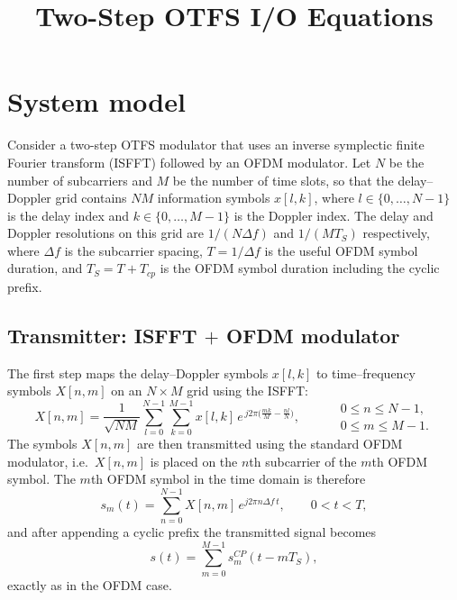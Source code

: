 \documentclass[11pt]{article}
\title{Two-Step OTFS I/O Equations}
\author{}
\date{}
\begin{document}
\maketitle

\section*{System model}

Consider a two-step OTFS modulator that uses an inverse symplectic finite
Fourier transform (ISFFT) followed by an OFDM modulator. Let \(N\) be the
number of subcarriers and \(M\) be the number of time slots, so that the
delay--Doppler grid contains \(NM\) information symbols
\(x[l,k]\), where \(l \in \{0,\dots,N-1\}\) is the delay index and
\(k \in \{0,\dots,M-1\}\) is the Doppler index. The delay and Doppler
resolutions on this grid are \(1/(N\Delta f)\) and \(1/(MT_S)\) respectively,
where \(\Delta f\) is the subcarrier spacing, \(T = 1/\Delta f\) is the useful
OFDM symbol duration, and \(T_S = T + T_{cp}\) is the OFDM symbol duration
including the cyclic prefix.

\subsection*{Transmitter: ISFFT \(+\) OFDM modulator}

The first step maps the delay--Doppler symbols \(x[l,k]\) to time--frequency
symbols \(X[n,m]\) on an \(N \times M\) grid using the ISFFT:
\begin{equation}
    X[n,m] = \frac{1}{\sqrt{NM}}
             \sum_{l=0}^{N-1}\sum_{k=0}^{M-1} x[l,k]\,
             e^{\,j2\pi\bigl(\tfrac{mk}{M} - \tfrac{nl}{N}\bigr)},
    \qquad
    \begin{aligned}
    &0 \leq n \leq N-1, \\
    &0 \leq m \leq M-1.
    \end{aligned}
\end{equation}
The symbols \(X[n,m]\) are then transmitted using the standard OFDM modulator,
i.e.\ \(X[n,m]\) is placed on the \(n\)th subcarrier of the \(m\)th OFDM
symbol. The \(m\)th OFDM symbol in the time domain is therefore
\begin{equation}
    s_m(t) = \sum_{n=0}^{N-1} X[n,m]\, e^{j2\pi n\Delta f\, t},
    \qquad 0 < t < T,
\end{equation}
and after appending a cyclic prefix the transmitted signal becomes
\begin{equation}
    s(t) = \sum_{m=0}^{M-1} s_m^{CP}(t - mT_S),
\end{equation}
exactly as in the OFDM case.
\end{document}
